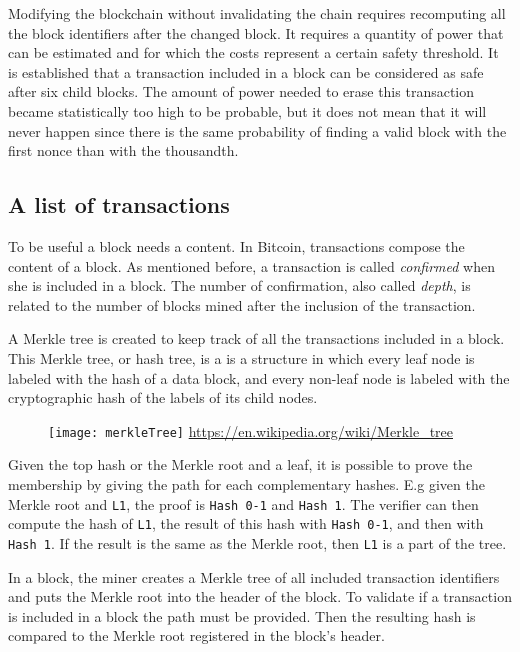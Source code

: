 Modifying the blockchain without invalidating the chain requires recomputing all
the block identifiers after the changed block. It requires a quantity of power
that can be estimated and for which the costs represent a certain safety
threshold. It is established that a transaction included in a block can be
considered as safe after six child blocks. The amount of power needed to erase
this transaction became statistically too high to be probable, but it does not
mean that it will never happen since there is the same probability of finding a
valid block with the first nonce than with the thousandth.

\subsection{A list of transactions}

To be useful a block needs a content. In Bitcoin, transactions compose the
content of a block. As mentioned before, a transaction is called
\textit{confirmed} when she is included in a block. The number of confirmation,
also called \textit{depth}, is related to the number of blocks mined after the
inclusion of the transaction.

A Merkle tree is created to keep track of all the transactions included in a
block. This Merkle tree, or hash tree, is a is a structure in which every leaf
node is labeled with the hash of a data block, and every non-leaf node is
labeled with the cryptographic hash of the labels of its child nodes.

\begin{figure}[H]
	\centering
	\texttt{[image: merkleTree]}
	{\url{https://en.wikipedia.org/wiki/Merkle_tree}}
	\label{fig:merkleTree}
\end{figure}

Given the top hash or the Merkle root and a leaf, it is possible to prove the
membership by giving the path for each complementary hashes. E.g given the
Merkle root and \texttt{L1}, the proof is \texttt{Hash 0-1} and \texttt{Hash 1}.
The verifier can then compute the hash of \texttt{L1}, the result of this hash
with \texttt{Hash 0-1}, and then with \texttt{Hash 1}. If the result is the same
as the Merkle root, then \texttt{L1} is a part of the tree.

In a block, the miner creates a Merkle tree of all included transaction
identifiers and puts the Merkle root into the header of the block. To validate
if a transaction is included in a block the path must be provided. Then the
resulting hash is compared to the Merkle root registered in the block's header.

